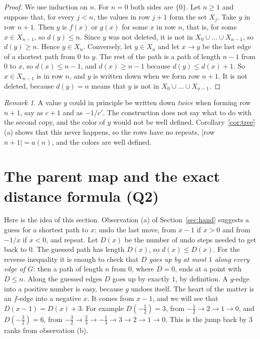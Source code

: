 \documentclass[11pt]{article}
\theoremstyle{definition}
\theoremstyle{remark}
\newtheorem{remark}[theorem]{Remark}
\begin{document}
\begin{proof}
We use induction on $n$. For $n=0$ both sides are $\{0\}$. Let $n\ge1$ and suppose that, for every
$j<n$, the values in row $j+1$ form the set $X_j$. Take $y$ in row $n+1$. Then $y$ is $f(x)$ or
$g(x)$ for some $x$ in row $n$, that is, for some $x\in X_{n-1}$, so $d(y)\le n$. Since $y$ was not
deleted, it is not in $X_0\cup\dots\cup X_{n-1}$, so $d(y)\ge n$. Hence $y\in X_n$. Conversely, let
$y\in X_n$ and let $x\to y$ be the last edge of a shortest path from $0$ to $y$. The rest of the path
is a path of length $n-1$ from $0$ to $x$, so $d(x)\le n-1$, and $d(x)\ge n-1$ because $d(y)\le
d(x)+1$. So $x\in X_{n-1}$ is in row $n$, and $y$ is written down when we form row $n+1$. It is not
deleted, because $d(y)=n$ means that $y$ is not in $X_0\cup\dots\cup X_{n-1}$.
\end{proof}

\begin{remark}\label{rem:dupes}
A value $y$ could in principle be written down \emph{twice} when forming row $n+1$, say as $c+1$
and as $-1/c'$. The construction does not say what to do with the second copy, and the color of $y$
would not be well defined. Corollary~\ref{cor:tree}(a) shows that this never happens, so the rows
have no repeats, $|$row $n+1|=a(n)$, and the colors are well defined.
\end{remark}

\section{The parent map and the exact distance formula (Q2)}\label{sec:parent}

Here is the idea of this section. Observation (a) of Section~\ref{sec:hand} suggests a guess for a
shortest path to $x$: undo the last move, from $x-1$ if $x>0$ and from $-1/x$ if $x<0$, and repeat.
Let $D(x)$ be the number of undo steps needed to get back to $0$. The guessed path has length
$D(x)$, so $d(x)\le D(x)$. For the reverse inequality it is enough to check that \emph{$D$ goes up by
at most $1$ along every edge of $G$}: then a path of length $n$ from $0$, where $D=0$, ends at a
point with $D\le n$. Along the guessed edges $D$ goes up by exactly $1$, by definition. A $g$-edge
into a positive number is easy, because $g$ undoes itself. The heart of the matter is an $f$-edge
into a negative $x$. It comes from $x-1$, and we will see that $D(x-1)=D(x)+3$. For example
$D(-\tfrac12)=3$, from $-\tfrac12\to2\to1\to0$, and $D(-\tfrac32)=6$, from
$-\tfrac32\to\tfrac23\to-\tfrac13\to3\to2\to1\to0$. This is the jump back by $3$ ranks from
observation (b).
\end{document}
